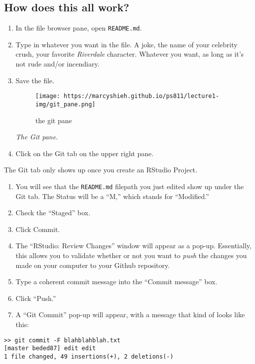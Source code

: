 \documentclass[
]{book}
\begin{document}
\hypertarget{how-does-this-all-work}{%
\subsection{How does this all work?}\label{how-does-this-all-work}}

\begin{enumerate}
\def\labelenumi{\arabic{enumi}.}
\setcounter{enumi}{1}
\item
  In the file browser pane, open \texttt{README.md}.
\item
  Type in whatever you want in the file. A joke, the name of your celebrity crush, your favorite \emph{Riverdale} character. Whatever you want, as long as it's not rude and/or incendiary.
\item
  Save the file.

  \begin{figure}
  \centering
  \texttt{[image: https://marcyshieh.github.io/ps811/lecture1-img/git\_pane.png]}
  \caption{the git pane}
  \end{figure}

  \emph{The Git pane.}
\item
  Click on the Git tab on the upper right pane.
\end{enumerate}

The Git tab only shows up once you create an RStudio Project.

\begin{enumerate}
\def\labelenumi{\arabic{enumi}.}
\setcounter{enumi}{5}
\item
  You will see that the \texttt{README.md} filepath you just edited show up under the Git tab. The Status will be a ``M,'' which stands for ``Modified.''
\item
  Check the ``Staged'' box.
\item
  Click Commit.
\item
  The ``RStudio: Review Changes'' window will appear as a pop-up. Essentially, this allows you to validate whether or not you want to \emph{push} the changes you made on your computer to your Github repository.
\item
  Type a coherent commit message into the ``Commit message'' box.
\item
  Click ``Push.''
\item
  A ``Git Commit'' pop-up will appear, with a message that kind of looks like this:
\end{enumerate}

\begin{verbatim}
>> git commit -F blahblahblah.txt
[master beded87] edit edit
1 file changed, 49 insertions(+), 2 deletions(-)
\end{verbatim}
\end{document}
